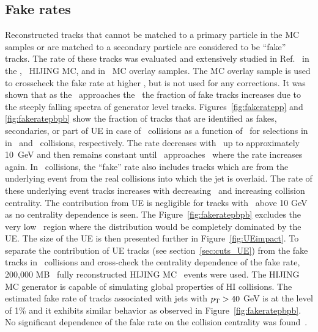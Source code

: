 \subsection{Fake rates}
\label{sec:fakerates}
Reconstructed tracks that cannot be matched to a primary particle in the MC samples or are matched to a secondary particle are considered to be ``fake'' tracks.
The rate of these tracks was evaluated and extensively studied in Ref.~\cite{PhysRevC.98.024908} in the \pp, \pbpb\ HIJING MC, and in \pbpb\ MC overlay samples.
The MC overlay sample is used to crosscheck the fake rate at higher \pt, but is not used for any corrections.
It was shown that as the \pttrk\ approaches the  \ptjet\ the fraction of fake tracks increases due to the steeply falling spectra of generator level tracks.
Figures~\ref{fig:fakeratepp} and \ref{fig:fakeratepbpb} show the fraction of tracks that are identified as fakes, secondaries, or part of UE in case of \PbPb\ collisions as a function of \pttrk\ for selections in \ptjet in \pp\ and \pbpb\ collisions, respectively.
The rate decreases with \pttrk\ up to approximately 10~GeV and then remains constant until \pttrk\ approaches \ptjet\ where the rate increases again.
In \pbpb\ collisions, the ``fake'' rate also includes tracks which are from the underlying event from the real collisions into which the jet is overlaid.
The rate of these underlying event tracks increases with decreasing \pttrk\ and increasing collision centrality.
The contribution from UE is negligible for tracks with \pT\ above 10 GeV as no centrality dependence is seen.
The Figure~\ref{fig:fakeratepbpb} excludes the very low \pT\ region where the distribution would be completely dominated by the UE.
The size of the UE is then presented further in Figure~\ref{fig:UEimpact}.
To separate the contribution of UE tracks (see section~\ref{sec:cuts_UE}) from the fake tracks in \PbPb\ collisions and cross-check the centrality dependence of the fake rate, 200,000 MB \PbPb\ fully reconstructed HIJING MC~\cite{Wang:1991hta} events were used.
The HIJING MC generator is capable of simulating global properties of HI collisions.
The estimated fake rate of tracks associated with jets with $\mbox{$p_{\mathrm{T}}$}>40$ GeV is at the level of 1\% and it exhibits similar behavior as observed in Figure~\ref{fig:fakeratepbpb}.
No significant dependence of the fake rate on the collision centrality was found~\cite{PhysRevC.98.024908}.

